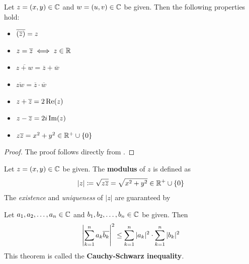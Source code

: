 \bigskip

\begin{theorem} \label{an:thm:properties-of-complex-conjugate}
    Let $z = (x, y) \in \C$ and $w = (u, v) \in \C$ be given. Then the following properties hold:
    \begin{itemize}
        \item $\overline{\paren*{\overline{z}}} = z$
        \item $z = \overline{z} \iff z \in \R$
        \item $\overline{z + w} = \overline{z} + \overline{w}$
        \item $\overline{zw} = \overline{z} \cdot \overline{w}$
        \item $z + \overline{z} = 2\Real(z)$
        \item $z - \overline{z} = 2i\Imag(z)$
        \item $z\overline{z} = x^{2} + y^{2} \in \R^{+} \cup \set*{0}$
    \end{itemize}
\end{theorem}

\begin{proof}
    The proof follows directly from .
\end{proof}

\bigskip

\begin{definition} \label{an:def:modulus}
    Let $z = (x, y) \in \C$ be given. The \textbf{modulus} of $z$ is defined as
    \[
    |z| \coloneqq \sqrt{z\overline{z}} = \sqrt{x^{2} + y^{2}} \in \R^{+} \cup \set*{0}
    \]
    The \emph{existence} and \emph{uniqueness} of $|z|$
    are guaranteed by 
\end{definition}

\bigskip

\begin{theorem} \label{an:thm:cauchy-schwarz-inequality}
    Let $a_{1}, a_{2}, \ldots, a_{n} \in \C$ and $b_{1}, b_{2}, \ldots, b_{n} \in \C$ be given. Then
    \[
    \abs*{\sum_{k = 1}^{n} a_{k} \overline{b_{k}}}^{2}
    \leq \sum_{k = 1}^{n} |a_{k}|^{2} \cdot \sum_{k = 1}^{n} |b_{k}|^{2}
    \]
    This theorem is called the \textbf{Cauchy-Schwarz inequality}.
\end{theorem}

